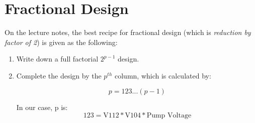\newpage
\section{Fractional Design}

On the lecture notes, the best recipe for fractional design (which is \textit{reduction by factor of 2}) is given as the following:
\begin{enumerate}
\item Write down a full factorial $2^{p-1}$ design.
\item Complete the design by the $p^{th}$ column, which is calculated by:

$$
p = 123...(p-1)
$$

In our case, p is:
$$123 = \text{V112}*\text{V104}*\text{Pump Voltage}$$


\end{enumerate}